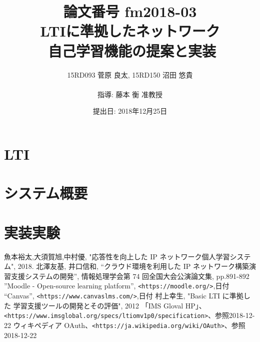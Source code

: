 \documentclass[11pt, a4paper]{jarticle}
\title{\LARGE 論文番号 fm2018-03\\ \Huge LTIに準拠したネットワーク\\自己学習機能の提案と実装}
\author{15RD093 菅原 良太, 15RD150 沼田 悠貴\\ \\指導: 藤本 衡 准教授}
\date{提出日: 2018年12月25日}
\begin{document}
\pagestyle{normal}
\maketitle
\thispagestyle{normal}
\clearpage


\fontsize{11pt}{28pt}\selectfont


\clearpage

\tableofcontents
\clearpage


\clearpage

%

\section{LTI}

%
%
%

\clearpage

\section{システム概要}



\clearpage

\section{実装実験}

\clearpage


\clearpage



\clearpage


\begin{thebibliography}{9999}
   魚本裕太,大須賀旭,中村優, "応答性を向上した
IP ネットワーク個人学習システム", 2018.
   北澤友基, 井口信和, “クラウド環境を利用した IP ネットワーク構築演習支援システムの開発”, 情報処理学会第 74 回全国大会公演論文集, pp.891-892
   ”Moodle - Open-source learning platform”, \texttt{<https://moodle.org/>},日付
   “Canvas”, \texttt{<https://www.canvaslms.com/>},日付
   村上幸生, "Basic LTI に準拠した 学習支援ツールの開発とその評価", 2012
   「IMS Gloval HP」、\texttt{<https://www.imsglobal.org/specs/ltiomv1p0/specification>}、参照2018-12-22
  ウィキペディア OAuth、\texttt{<https://ja.wikipedia.org/wiki/OAuth>}、参照2018-12-22
\end{thebibliography}
\end{document}
